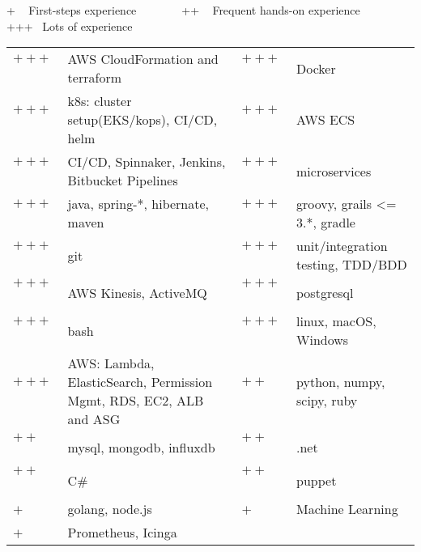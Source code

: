 
\newcommand{\plus}{$+~$~~~~}
\newcommand{\pplus}{$++~$~~~~}
\newcommand{\ppplus}{$+++$~~~~~}
\begin{cventries}
\cventry
{+ ~ First-steps experience ~~~  ~~~ ++ ~ Frequent hands-on experience ~~~  ~~~ +++ ~Lots of experience \vspace{0.1em}} %
{} %
{} %
{} %
{ %
\hspace{1em}
\setlength{\tabcolsep}{3pt}
\begin{tabular}{  l l @{\hskip 3mm} l l }
		   \ppplus & AWS CloudFormation and terraform &  \ppplus & Docker\\
		   \ppplus & k8s: cluster setup(EKS/kops), CI/CD, helm & \ppplus & AWS ECS\\
		   \ppplus & CI/CD, Spinnaker, Jenkins, Bitbucket Pipelines & \ppplus & microservices \\
           \ppplus & java, spring-*, hibernate, maven  & \ppplus & groovy, grails <= 3.*, gradle \\ 
           \ppplus & git & \ppplus & unit/integration testing, TDD/BDD   \\
		   \ppplus & AWS Kinesis, ActiveMQ & \ppplus & postgresql\\
           \ppplus & bash\vspace{0.7em} & \ppplus & linux, macOS, Windows\\ 
           \ppplus & AWS: Lambda, ElasticSearch, Permission Mgmt, RDS, EC2, ALB and ASG & \pplus &python, numpy, scipy, ruby \\ 
           \pplus & mysql, mongodb, influxdb  & \pplus & .net  \\
           \pplus & C\# & \pplus & puppet \\
           \plus & golang, node.js & \plus & Machine Learning \\
           \plus & Prometheus, Icinga
\end{tabular}
}
\end{cventries}
